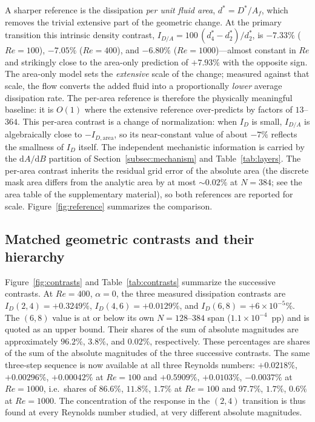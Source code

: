 A sharper reference is the dissipation \emph{per unit fluid area}, $d^*=D^*/A_f$, which removes the trivial extensive part of the geometric change. At the primary transition this intrinsic density contrast, $I_{D/A}=100\,(d^*_4-d^*_2)/d^*_2$, is $-7.33\%$ ($Re=100$), $-7.05\%$ ($Re=400$), and $-6.80\%$ ($Re=1000$)---almost constant in $Re$ and strikingly close to the area-only prediction of $+7.93\%$ with the opposite sign. The area-only model sets the \emph{extensive} scale of the change; measured against that scale, the flow converts the added fluid into a proportionally \emph{lower} average dissipation rate. The per-area reference is therefore the physically meaningful baseline: it is $O(1)$ where the extensive reference over-predicts by factors of $13$--$364$. This per-area contrast is a change of normalization: when $I_D$ is small, $I_{D/A}$ is algebraically close to $-I_{D,\mathrm{area}}$, so its near-constant value of about $-7\%$ reflects the smallness of $I_D$ itself. The independent mechanistic information is carried by the $\mathrm{d}A/\mathrm{d}B$ partition of Section~\ref{subsec:mechanism} and Table~\ref{tab:layers}. The per-area contrast inherits the residual grid error of the absolute area (the discrete mask area differs from the analytic area by at most $\sim0.02\%$ at $N=384$; see the area table of the supplementary material), so both references are reported for scale. Figure~\ref{fig:reference} summarizes the comparison.

\subsection{Matched geometric contrasts and their hierarchy}
\label{subsec:contrastresult}

Figure~\ref{fig:contrasts} and Table~\ref{tab:contrasts} summarize the successive contrasts. At $Re=400$, $\alpha=0$, the three measured dissipation contrasts are $I_D(2,4)=+0.3249\%$, $I_D(4,6)=+0.0129\%$, and $I_D(6,8)=+6\times10^{-5}\%$. The $(6,8)$ value is at or below its own $N = 128$--$384$ span ($1.1\times10^{-4}$~pp) and is quoted as an upper bound. Their shares of the sum of absolute magnitudes are approximately $96.2\%$, $3.8\%$, and $0.02\%$, respectively. These percentages are shares of the sum of the absolute magnitudes of the three successive contrasts. The same three-step sequence is now available at all three Reynolds numbers: $+0.0218\%$, $+0.00296\%$, $+0.00042\%$ at $Re=100$ and $+0.5909\%$, $+0.0103\%$, $-0.0037\%$ at $Re=1000$, i.e.\ shares of $86.6\%$, $11.8\%$, $1.7\%$ at $Re=100$ and $97.7\%$, $1.7\%$, $0.6\%$ at $Re=1000$. The concentration of the response in the $(2,4)$ transition is thus found at every Reynolds number studied, at very different absolute magnitudes.

